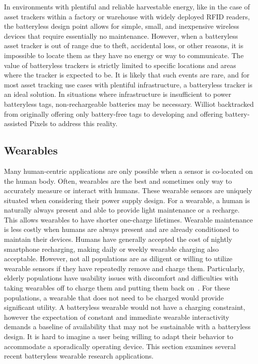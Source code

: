 In environments with plentiful and reliable harvestable energy, like in the case of asset trackers within a factory or warehouse with widely deployed RFID readers, the batteryless design point allows for simple, small, and inexpensive wireless devices that require essentially no maintenance.
However, when a batteryless asset tracker is out of range due to theft, accidental loss, or other reasons, it is impossible to locate them as they have no energy or way to communicate.
The value of batteryless trackers is strictly limited to specific locations and areas where the tracker is expected to be.
It is likely that such events are rare, and for most asset tracking use cases with plentiful infrastructure, a batteryless tracker is an ideal solution.
In situations where infrastructure is insufficient to power batteryless tags, non-rechargeable batteries may be necessary. Williot backtracked from originally offering only battery-free tags to developing and offering battery-assisted Pixels to address this reality.

\subsection{Wearables}
Many human-centric applications are only possible when a sensor is co-located on the human body.
Often, wearables are the 
best and sometimes only way to accurately measure or interact with humans. 
These wearable sensors are uniquely situated when considering their power supply design.
For a wearable, a human is naturally always present and able to provide light maintenance or a recharge.
This allows wearables to have shorter one-charge lifetimes. 
Wearable maintenance is less costly when humans are always present and are already conditioned to maintain their devices.
Humans have generally accepted the cost of nightly smartphone recharging, making daily or weekly wearable charging also acceptable.
However, not all populations are as diligent or willing to utilize wearable sensors if they have repeatedly remove and charge them. Particularly, elderly populations have usability issues with discomfort and difficulties with taking wearables off to charge them and putting them back on~\cite{valk2018designing}.
For these populations, a wearable that does not need to be charged would provide significant utility. 
A batteryless wearable would not have a charging constraint, however
the expectation of constant and immediate wearable interactivity demands a baseline of availability that may not be sustainable with a batteryless design.
It is hard to imagine a user being willing to adapt their behavior to accommodate a sporadically operating device.
This section examines several recent batteryless wearable research applications. 

